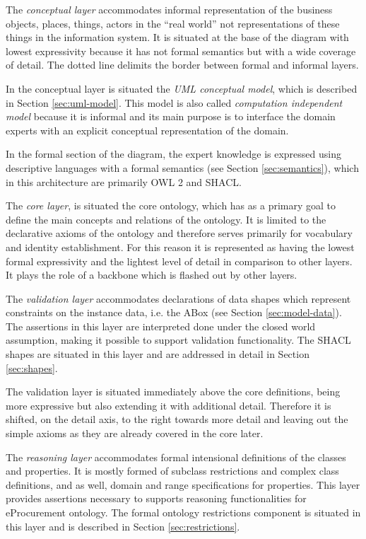 	The \textit{conceptual layer} accommodates informal representation of the business objects, places, things, actors in the ``real world'' not representations of these things in the information system. It is situated at the base of the diagram with lowest expressivity because it has not formal semantics but with a wide coverage of detail. The dotted line delimits the border between formal and informal layers.
	
	In the conceptual layer is situated the \textit{UML conceptual model}, which is described in Section \ref{sec:uml-model}. This model is also called \textit{computation independent model} because it is informal and its main purpose is to interface the domain experts with an explicit conceptual representation of the domain.
		
	In the formal section of the diagram, the expert knowledge is expressed using descriptive languages with a formal semantics (see Section \ref{sec:semantics}), which in this architecture are primarily OWL 2\cite{owl2} and SHACL\cite{shacl-spec}. 
		
	The \textit{core layer}, is situated the core ontology, which has as a primary goal to define the main concepts and relations of the ontology. It is limited to the declarative axioms of the ontology and therefore serves primarily for vocabulary and identity establishment. For this reason it is represented as having the lowest formal expressivity and the lightest level of detail in comparison to other layers. It plays the role of a backbone which is flashed out by other layers. 

	The \textit{validation layer} accommodates declarations of data shapes which represent constraints on the instance data, i.e. the ABox (see Section \ref{sec:model-data}). The assertions in this layer are interpreted done under the closed world assumption, making it possible to support validation functionality. The SHACL shapes are situated in this layer and are addressed in detail in Section \ref{sec:shapes}.
	
	The validation layer is situated immediately above the core definitions, being more expressive but also extending it with additional detail. Therefore it is shifted, on the detail axis, to the right towards more detail and leaving out the simple axioms as they are already covered in the core later.
	
	The \textit{reasoning layer} accommodates formal intensional definitions of the classes and properties. It is mostly formed of subclass restrictions and complex class definitions, and as well, domain and range specifications for properties. This layer provides assertions necessary to supports reasoning functionalities for eProcurement ontology. The formal ontology restrictions component is situated in this layer and is described in Section \ref{sec:restrictions}.
	

